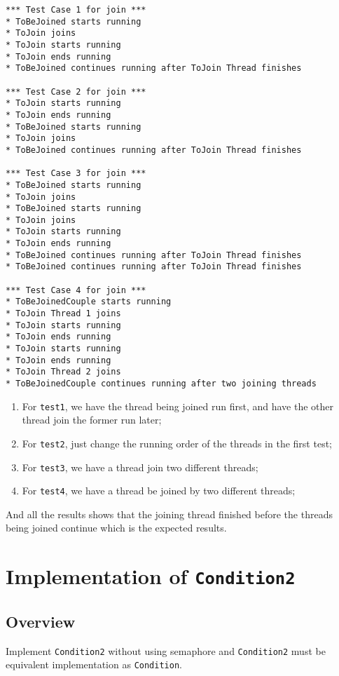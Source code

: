 \documentclass{article}
\begin{document}
\begin{lstlisting}
*** Test Case 1 for join ***
* ToBeJoined starts running
* ToJoin joins
* ToJoin starts running
* ToJoin ends running
* ToBeJoined continues running after ToJoin Thread finishes

*** Test Case 2 for join ***
* ToJoin starts running
* ToJoin ends running
* ToBeJoined starts running
* ToJoin joins
* ToBeJoined continues running after ToJoin Thread finishes

*** Test Case 3 for join ***
* ToBeJoined starts running
* ToJoin joins
* ToBeJoined starts running
* ToJoin joins
* ToJoin starts running
* ToJoin ends running
* ToBeJoined continues running after ToJoin Thread finishes
* ToBeJoined continues running after ToJoin Thread finishes

*** Test Case 4 for join ***
* ToBeJoinedCouple starts running
* ToJoin Thread 1 joins
* ToJoin starts running
* ToJoin ends running
* ToJoin starts running
* ToJoin ends running
* ToJoin Thread 2 joins
* ToBeJoinedCouple continues running after two joining threads
\end{lstlisting}

\begin{enumerate}
\item For \texttt{test1}, we have the thread being joined run first, and have the other thread join the former run later;
\item For \texttt{test2}, just change the running order of the threads in the first test;
\item For \texttt{test3}, we have a thread join two different threads;
\item For \texttt{test4}, we have a thread be joined by two different threads;
\end{enumerate}

 And all the results shows that the joining thread finished before the threads being joined continue which is the expected results.
\section{Implementation of \texttt{Condition2}}
\subsection{Overview}
Implement \texttt{Condition2} without using semaphore and \texttt{Condition2} must be equivalent implementation as \texttt{Condition}.
\end{document}
